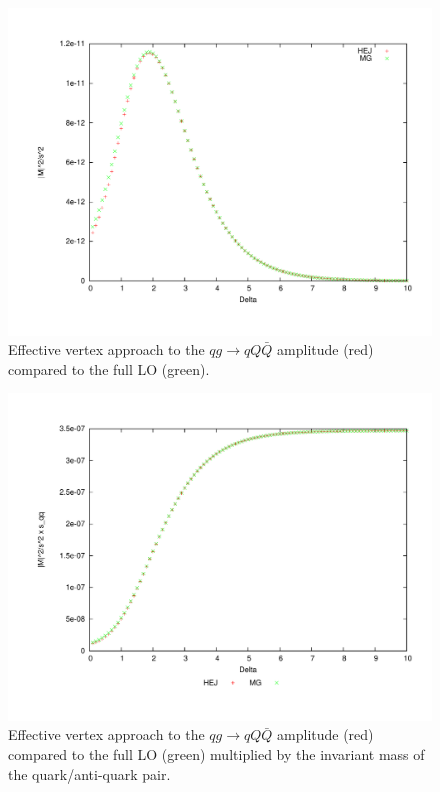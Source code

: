 \begin{figure}[H]
\centering
\includegraphics[scale= 0.45]{Images/qg_qqqx.pdf}
\caption{Effective vertex approach to the $qg \to qQ\bar{Q}$ amplitude (red) compared to the full LO (green).}
\label{fig:qg_qqqx}
\end{figure}

\begin{figure}[H]
\centering
\includegraphics[scale=0.45]{Images/qg_qQQx_sqqx.pdf}
\caption{Effective vertex approach to the $qg \to qQ\bar{Q}$ amplitude (red) compared to the full LO (green) multiplied by the invariant mass of the quark/anti-quark pair.}
\label{fig:qg_qqqx_sqqx}
\end{figure}

